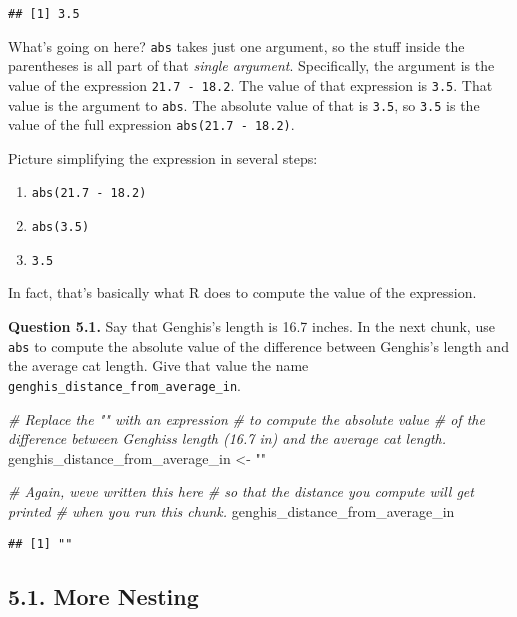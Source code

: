 \documentclass[
]{article}
\newenvironment{Shaded}{\begin{snugshade}}{\end{snugshade}}
\newcommand{\CommentTok}[1]{\textcolor[rgb]{0.56,0.35,0.01}{\textit{#1}}}
\newcommand{\NormalTok}[1]{#1}
\newcommand{\OtherTok}[1]{\textcolor[rgb]{0.56,0.35,0.01}{#1}}
\newcommand{\StringTok}[1]{\textcolor[rgb]{0.31,0.60,0.02}{#1}}
\providecommand{\tightlist}{%
  \setlength{\itemsep}{0pt}\setlength{\parskip}{0pt}}
\begin{document}
\begin{verbatim}
## [1] 3.5
\end{verbatim}

What's going on here? \texttt{abs} takes just one argument, so the stuff
inside the parentheses is all part of that \emph{single argument}.
Specifically, the argument is the value of the expression
\texttt{21.7\ -\ 18.2}. The value of that expression is \texttt{3.5}.
That value is the argument to \texttt{abs}. The absolute value of that
is \texttt{3.5}, so \texttt{3.5} is the value of the full expression
\texttt{abs(21.7\ -\ 18.2)}.

Picture simplifying the expression in several steps:

\begin{enumerate}
\def\labelenumi{\arabic{enumi}.}
\tightlist
\item
  \texttt{abs(21.7\ -\ 18.2)}
\item
  \texttt{abs(3.5)}
\item
  \texttt{3.5}
\end{enumerate}

In fact, that's basically what R does to compute the value of the
expression.

\textbf{Question 5.1.} Say that Genghis's length is 16.7 inches. In the
next chunk, use \texttt{abs} to compute the absolute value of the
difference between Genghis's length and the average cat length. Give
that value the name \texttt{genghis\_distance\_from\_average\_in}.

\begin{Shaded}
\begin{Highlighting}[]
\CommentTok{\# Replace the "" with an expression }
\CommentTok{\# to compute the absolute value }
\CommentTok{\# of the difference between Genghis\textquotesingle{}s length (16.7 in) and the average cat length.}
\NormalTok{genghis\_distance\_from\_average\_in }\OtherTok{\textless{}{-}} \StringTok{""}

\CommentTok{\# Again, we\textquotesingle{}ve written this here }
\CommentTok{\# so that the distance you compute will get printed }
\CommentTok{\# when you run this chunk.}
\NormalTok{genghis\_distance\_from\_average\_in}
\end{Highlighting}
\end{Shaded}

\begin{verbatim}
## [1] ""
\end{verbatim}

\subsection{5.1. More Nesting}\label{more-nesting}
\end{document}
